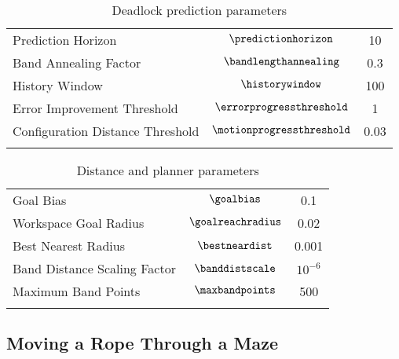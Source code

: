 \begin{table}[t]
\centering
\caption{Deadlock prediction parameters}
\label{tab:deadlock_param_table}
\begin{tabular}{lcc}
\noalign{\smallskip}\hline\noalign{\smallskip}
Prediction Horizon                  & $\predictionhorizon$          &    10 \\
Band Annealing Factor               & $\bandlengthannealing$        &   0.3 \\
History Window                      & $\historywindow$              &   100 \\
Error Improvement Threshold         & $\errorprogressthreshold$     &     1 \\
Configuration Distance Threshold    & $\motionprogressthreshold$    &  0.03 \\
\noalign{\smallskip}\hline
\end{tabular}
\end{table}


\begin{table}[t]
\centering
\caption{Distance and planner parameters}
\label{tab:rrt_param_table}
\begin{tabular}{lcc}
\noalign{\smallskip}\hline\noalign{\smallskip}
Goal Bias                           & $\goalbias$                   &     0.1 \\
Workspace Goal Radius               & $\goalreachradius$            &     0.02 \\
Best Nearest Radius                 & $\bestneardist$               &     0.001 \\
Band Distance Scaling Factor        & $\banddistscale$              & $10^{-6}$ \\
Maximum Band Points                 & $\maxbandpoints$              & 500 \\
\noalign{\smallskip}\hline
\end{tabular}
\end{table}




\subsection{Moving a Rope Through a Maze}


